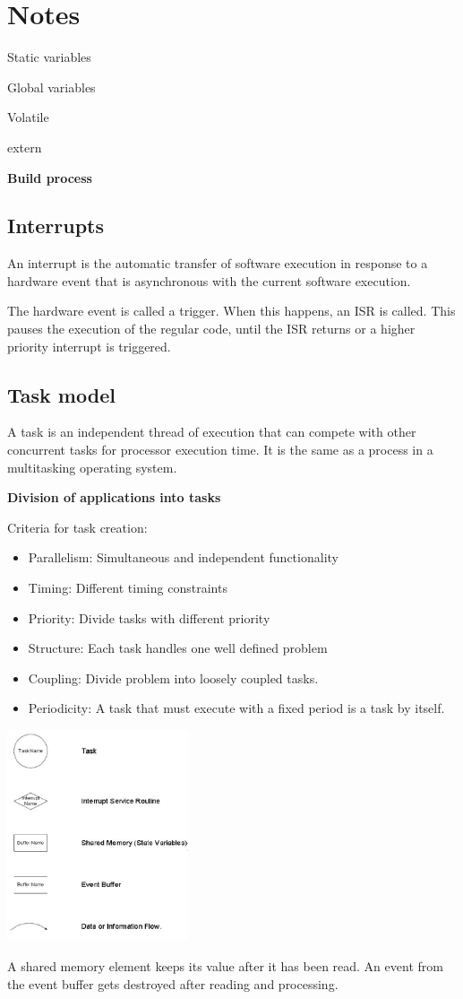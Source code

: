 \section{Notes}

Static variables

Global variables

Volatile

extern


\textbf{Build process}



\subsection{Interrupts}
An interrupt is the automatic transfer of software execution in response to a hardware event that is asynchronous with the current software execution.

The hardware event is called a trigger. When this happens, an ISR is called.
This pauses the execution of the regular code, until the ISR returns or a
higher priority interrupt is triggered.


\subsection{Task model}
A task is an independent thread of execution that can compete with
other concurrent tasks for processor execution time.
It is the same as a process in a multitasking operating system.

\textbf{Division of applications into tasks}

Criteria for task creation:

\begin{itemize}
	\item{Parallelism: Simultaneous and independent functionality}
	\item{Timing: Different timing constraints}
	\item{Priority: Divide tasks with different priority}
	\item{Structure: Each task handles one well defined problem}
	\item{Coupling: Divide problem into loosely coupled tasks.}
	\item{Periodicity: A task that must execute with a fixed period is a task by itself.}
\end{itemize}

\begin{center}
	\includegraphics[width=0.4\textwidth]{images/taskDiagramComponents.png}
\end{center}

A shared memory element keeps its value after it has been read.
An event from the event buffer gets destroyed after reading and processing.

